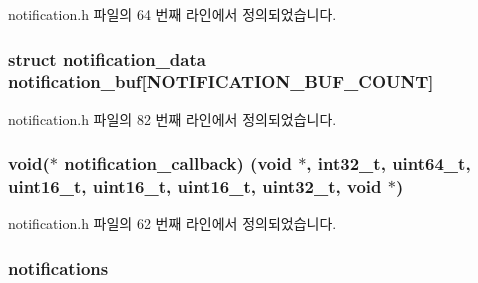 notification.\+h 파일의 64 번째 라인에서 정의되었습니다.

\subsubsection[{\texorpdfstring{notification\+\_\+buf}{notification_buf}}]{\setlength{\rightskip}{0pt plus 5cm}struct {\bf notification\+\_\+data} notification\+\_\+buf\mbox{[}{\bf N\+O\+T\+I\+F\+I\+C\+A\+T\+I\+O\+N\+\_\+\+B\+U\+F\+\_\+\+C\+O\+U\+NT}\mbox{]}\hspace{0.3cm}{\ttfamily [protected]}}\hypertarget{classavdecc__lib_1_1notification_a87642905af524dd0472d4646f3cea881}{}\label{classavdecc__lib_1_1notification_a87642905af524dd0472d4646f3cea881}


notification.\+h 파일의 82 번째 라인에서 정의되었습니다.

\subsubsection[{\texorpdfstring{notification\+\_\+callback}{notification_callback}}]{\setlength{\rightskip}{0pt plus 5cm}void($\ast$ notification\+\_\+callback) (void $\ast$, {\bf int32\+\_\+t}, {\bf uint64\+\_\+t}, uint16\+\_\+t, uint16\+\_\+t, uint16\+\_\+t, {\bf uint32\+\_\+t}, void $\ast$)\hspace{0.3cm}{\ttfamily [protected]}}\hypertarget{classavdecc__lib_1_1notification_a0aaf6a2e3f6d6e3fb6b416e9c2f7f6e9}{}\label{classavdecc__lib_1_1notification_a0aaf6a2e3f6d6e3fb6b416e9c2f7f6e9}


notification.\+h 파일의 62 번째 라인에서 정의되었습니다.

\subsubsection[{\texorpdfstring{notifications}{notifications}}]{ {\bf notifications}\hspace{0.3cm}{\ttfamily [protected]}}\hypertarget{classavdecc__lib_1_1notification_a02a497f6526df74aec4060942683da34}{}\label{classavdecc__lib_1_1notification_a02a497f6526df74aec4060942683da34}


